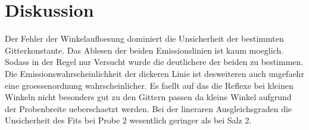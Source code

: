 \section{Diskussion}\label{sec:Diskussion}
Der Fehler der Winkelaufloesung  dominiert die Unsicherheit der bestimmten
Gitterkonstante. 
Das Ablesen der beiden Emissionslinien ist kaum moeglich. 
Sodass in der Regel nur Versucht wurde die deutlichere der beiden zu bestimmen.
Die Emissionswahrscheinlichkeit der dickeren Linie ist desweiteren auch
ungefaehr eine groessenordnung wahrscheinlicher. 
Es faellt auf das die Reflexe bei kleinen Winkeln nicht besonders gut zu den
Gittern passen da kleine Winkel aufgrund der Probenbreite ueberschaetzt werden.
Bei der lineraren Ausgleichsgraden die Unsicherheit des Fits bei Probe 2 
wesentlich geringer als bei Salz 2. 

